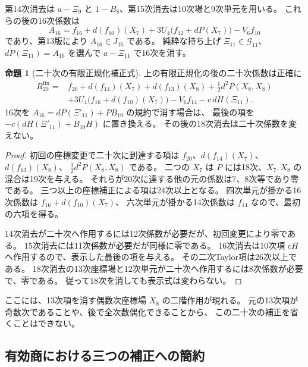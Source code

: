 \documentclass[a4paper,11pt]{ltjsarticle}
\theoremstyle{definition}
\newtheorem{proposition}[theorem]{命題}
\begin{document}
第14次消去は $a-\Xi_9$ と $1-B_8$、第15次消去は10次場と9次単元を用いる。
これらの後の16次係数は
\begin{equation}\label{eq:v15-sixteenth-input}
 A_{16}=f_{16}+d(f_{10})(X_7)
             +3U_4\bigl(f_{12}+dP(X_7)\bigr)-V_6f_{10}
\end{equation}
であり、第13版により $A_{16}\in J_{16}$ である。
純粋な持ち上げ $\Xi_{11}\in\mathcal G_{11}$、
$dP(\Xi_{11})=A_{16}$ を選んで $a-\Xi_{11}$ で16次を消す。

\begin{proposition}[二十次の有限正規化補正式]
\label{prop:v15-exact-twentieth-correction}
上の有限正規化の後の二十次係数は正確に
\begin{equation}\label{eq:v15-exact-twentieth-correction}
 \begin{split}
 R_{20}^{\mathrm{fin}}={}&f_{20}+d(f_{14})(X_7)+d(f_{13})(X_8)
       +\frac12d^2P(X_8,X_8)\\
   &+3U_4\bigl(f_{16}+d(f_{10})(X_7)\bigr)-V_6f_{14}
       -c\,dH(\Xi_{11}).
 \end{split}
\end{equation}
16次を $A_{16}=dP(\Xi'_{11})+PB_{10}$ の規約で消す場合は、
最後の項を $-c(dH(\Xi'_{11})+B_{10}H)$ に置き換える。
その後の18次消去は二十次係数を変えない。
\end{proposition}

\begin{proof}
初回の座標変更で二十次に到達する項は
$f_{20}$、$d(f_{14})(X_7)$、$d(f_{13})(X_8)$、
$\tfrac12d^2P(X_8,X_8)$ である。
二つの $X_7$ は $P$ には18次、$X_7,X_8$ の混合は19次を与える。
それらが20次に達する他の元の係数は7、8次等であり零である。
三つ以上の座標補正による項は24次以上となる。
四次単元が掛かる16次係数は $f_{16}+d(f_{10})(X_7)$、
六次単元が掛かる14次係数は $f_{14}$ なので、最初の六項を得る。

14次消去が二十次へ作用するには12次係数が必要だが、初回変更により零である。
15次消去には11次係数が必要だが同様に零である。
16次消去は10次項 $cH$ へ作用するので、表示した最後の項を与える。
その二次Taylor項は26次以上である。
18次消去の13次座標場と12次単元が二十次へ作用するには8次係数が必要で、零である。
従って18次を消しても表示式は変わらない。
\end{proof}

ここには、13次項を消す偶数次座標場 $X_8$ の二階作用が現れる。
元の13次項が奇数次であることや、後で全次数偶化できることから、
この二十次の補正を省くことはできない。

\subsection{有効商における三つの補正への簡約}
\end{document}
